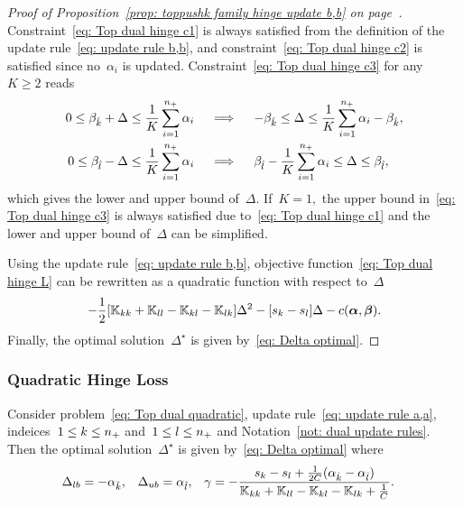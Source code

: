 \toprulebb*
\begin{proof}[Proof of Proposition~\ref{prop: toppushk family hinge update b,b} on page~\pageref{prop: toppushk family hinge update b,b}]
  Constraint~\eqref{eq: Top dual hinge c1} is always satisfied from the definition of the update rule~\eqref{eq: update rule b,b}, and constraint~\eqref{eq: Top dual hinge c2} is satisfied since no~$\alpha_i$ is updated. Constraint~\eqref{eq: Top dual hinge c3} for any~$K \geq 2$ reads
  \begin{align*}
    0 \leq \beta_{\hat{k}} + \Delta \leq \frac{1}{K} \sum_{i = 1}^{n_{+}} \alpha_i 
    & \quad \implies \quad
    -\beta_{\hat{k}} \leq \Delta \leq \frac{1}{K} \sum_{i = 1}^{n_{+}} \alpha_i - \beta_{\hat{k}}, \\
    0 \leq \beta_{\hat{l}} - \Delta \leq \frac{1}{K} \sum_{i = 1}^{n_{+}} \alpha_i
    & \quad \implies \quad
    \beta_{\hat{l}} - \frac{1}{K} \sum_{i = 1}^{n_{+}} \alpha_i \leq \Delta \leq \beta_{\hat{l}},
  \end{align*}
  which gives the lower and upper bound of~$\Delta.$ If~$K = 1,$ the upper bound in~\eqref{eq: Top dual hinge c3} is always satisfied due to~\eqref{eq: Top dual hinge c1} and the lower and upper bound of~$\Delta$ can be simplified.
  
  Using the update rule~\eqref{eq: update rule b,b}, objective function~\eqref{eq: Top dual hinge L} can be rewritten as a quadratic function with respect to~$\Delta$
  \begin{equation*}
    - \frac{1}{2} \Brac[s]{\K_{kk} + \K_{ll} - \K_{kl} - \K_{lk}} \Delta^2
    - \Brac[s]{s_k - s_l} \Delta
    - c(\bm{\alpha}, \bm{\beta}).
  \end{equation*}
  Finally, the optimal solution~$\Delta^{\star}$ is given by~\eqref{eq: Delta optimal}.
\end{proof}

\subsubsection{Quadratic Hinge Loss}

\begin{proposition}\label{prop: toppushk family quadratic update a,a}
  Consider problem~\eqref{eq: Top dual quadratic}, update rule~\eqref{eq: update rule a,a}, indeices~$1 \leq k \leq n_{+}$ and~$1 \leq l \leq n_{+}$ and Notation~\ref{not: dual update rules}. Then the optimal solution~$\Delta^{\star}$ is given by~\eqref{eq: Delta optimal} where
  \begin{align*}
    \Delta_{lb} & = -\alpha_{\hat{k}}, &
    \Delta_{ub} & = \alpha_{\hat{l}}, &
    \gamma & = -\frac{s_k - s_l + \frac{1}{2C}(\alpha_{\hat{k}} - \alpha_{\hat{l}})}{\mathbb{K}_{kk} + \mathbb{K}_{ll} - \mathbb{K}_{kl} - \mathbb{K}_{lk} + \frac{1}{C}}.
  \end{align*}
\end{proposition}

